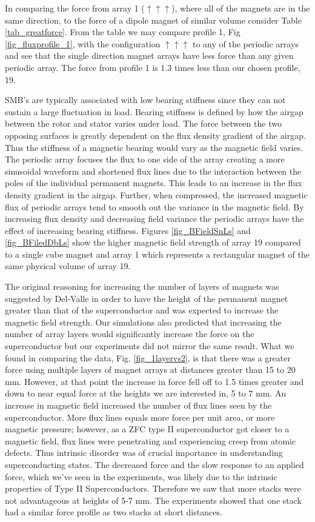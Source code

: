 In comparing the force from array 1 ($\uparrow \uparrow \uparrow $), where all of the magnets are in the same direction, to the force of a dipole magnet of similar volume consider Table \ref{tab_greatforce}.  From the table we may compare profile 1, Fig \ref{fig_fluxprofile_1},  with the configuration $\uparrow \uparrow \uparrow$ to any of the periodic arrays and see that the single direction magnet arrays have less force than any given periodic array.  The force from profile 1 is 1.3 times less than our chosen profile, 19.  

SMB's are typically associated with low bearing stiffness since they can not sustain a large fluctuation in load. Bearing stiffness is defined by how the airgap between the rotor and stator varies under load.  The force between the two opposing surfaces is greatly dependent on the flux density gradient of the airgap. Thus the stiffness of a magnetic bearing would vary as the magnetic field varies. The periodic array focuses the flux to one side of the array creating a more sinusoidal waveform and shortened flux lines due to the interaction between the poles of the individual permanent magnets.  This leads to an increase in the flux density gradient in the airgap.  Further, when compressed, the increased magnetic flux of periodic arrays tend to smooth out the variance in the magnetic field. By increasing flux density and decreasing field variance the periodic arrays have the effect of increasing bearing stiffness. Figures \ref{fig_BFieldSnLs} and \ref{fig_BFiledDbLs} show the higher magnetic field strength of array 19 compared to a single cube magnet and array 1 which represents a rectangular magnet of the same physical volume of array 19.

The original reasoning for increasing the number of layers of magnets was suggested by Del-Valle \cite{del1} in order to have the height of the permanent magnet greater than that of the superconductor and was expected to increase the magnetic field strength.  Our simulations also predicted that increasing the number of array layers would significantly increase the force on the superconductor but our experiments did not mirror the same result.  What we found in comparing the data, Fig. \ref{fig_1layervs2}, is that there was a greater force using multiple layers of magnet arrays at distances greater than 15 to 20 mm.  However, at that point the increase in force fell off to 1.5 times greater and down to near equal force at the heights we are interested in, 5 to 7 mm.  An increase in magnetic field increased the number of flux lines seen by the superconductor.  More flux lines equals more force per unit area, or more magnetic pressure; however, as a ZFC type II superconductor got closer to a magnetic field, flux lines were penetrating and experiencing creep from atomic defects.  Thus intrinsic disorder was of crucial importance in understanding superconducting states.  The decreased force and the slow response to an applied force, which we've seen in the experiments, was likely due to the intrinsic properties of Type II Superconductors. Therefore we saw that more stacks were not advantageous at heights of 5-7 mm. The experiments showed that one stack had a similar force profile as two stacks at short distances.

